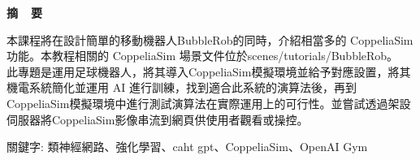 \renewcommand{\baselinestretch}{1.5} %
\clearpage  %
\sectionef
{} %
\begin{center}
\LARGE\textbf{摘~~要}\\
\end{center}
\begin{flushleft}
\fontsize{14pt}{20pt}\sectionef\hspace{12pt}\quad 本課程將在設計簡單的移動機器人BubbleRob的同時，介紹相當多的 CoppeliaSim 功能。本教程相關的 CoppeliaSim 場景文件位於scenes/tutorials/BubbleRob。\\[12pt]

\fontsize{14pt}{20pt}\sectionef\hspace{12pt}\quad 此專題是運用足球機器人，將其導入CoppeliaSim模擬環境並給予對應設置，將其機電系統簡化並運用 AI 進行訓練，找到適合此系統的演算法後，再到CoppeliaSim模擬環境中進行測試演算法在實際運用上的可行性。並嘗試透過架設伺服器將CoppeliaSim影像串流到網頁供使用者觀看或操控。\\[12pt]

\end{flushleft}
\begin{center}
\fontsize{14pt}{20pt}\selectfont 關鍵字: 類神經網路、強化學習、caht gpt、\sectionef CoppeliaSim、OpenAI Gym
\end{center}